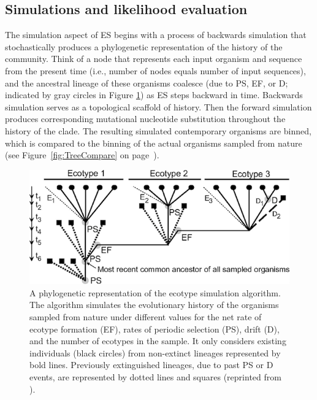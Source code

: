 \subsection*{Simulations and likelihood evaluation}
The simulation aspect of ES begins with a process of backwards simulation that stochastically produces a phylogenetic representation of the history of the community.
Think of a node that represents each input organism and sequence from the present time (i.e., number of nodes equals number of input sequences), and the ancestral lineage of these organisms coalesce (due to PS, EF, or D; indicated by gray circles in Figure \ref{fig:SpeciationGraph}) as ES steps backward in time.
Backwards simulation serves as a topological scaffold of history.
Then the forward simulation produces corresponding mutational nucleotide substitution throughout the history of the clade.
The resulting simulated contemporary organisms are binned, which is compared to the binning of the actual organisms sampled from nature (see Figure~\ref{fig:TreeCompare} on page~\pageref{fig:TreeCompare}).

\begin{figure}[h!]

  \centering
   \includegraphics{images/Speciation-CH2}
   \caption[Detailed phylogeny with putative ecotype simulation events.]{A phylogenetic representation of the ecotype simulation algorithm. The algorithm simulates the evolutionary history of the organisms sampled from nature under different values for the net rate of ecotype formation (EF), rates of periodic selection (PS), drift (D), and the number of ecotypes in the sample. It only considers existing individuals (black circles) from non-extinct lineages represented by bold lines. Previously extinguished lineages, due to past PS or D events, are represented by dotted lines and squares (reprinted from \protect\cite{koeppel2008identifying}).}
   \label{fig:SpeciationGraph}
\end{figure}


